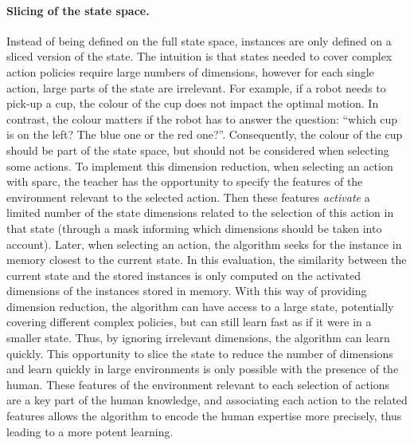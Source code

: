 \paragraph{Slicing of the state space.} Instead of being defined on the full state space, instances are only defined on a sliced version of the state. The intuition is that states needed to cover complex action policies require large numbers of dimensions, however for each single action, large parts of the state are irrelevant. For example, if a robot needs to pick-up a cup, the colour of the cup does not impact the optimal motion. In contrast, the colour matters if the robot has to answer the question: ``which cup is on the left? The blue one or the red one?''. Consequently, the colour of the cup should be part of the state space, but should not be considered when selecting some actions. To implement this dimension reduction, when selecting an action with \gls{sparc}, the teacher has the opportunity to specify the features of the environment relevant to the selected action. Then these features \textit{activate} a limited number of the state dimensions related to the selection of this action in that state (through a mask informing which dimensions should be taken into account). Later, when selecting an action, the algorithm seeks for the instance in memory closest to the current state. In this evaluation, the similarity between the current state and the stored instances is only computed on the activated dimensions of the instances stored in memory. With this way of providing dimension reduction, the algorithm can have access to a large state, potentially covering different complex policies, but can still learn fast as if it were in a smaller state. Thus, by ignoring irrelevant dimensions, the algorithm can learn quickly. This opportunity to slice the state to reduce the number of dimensions and learn quickly in large environments is only possible with the presence of the human. These features of the environment relevant to each selection of actions are a key part of the human knowledge, and associating each action to the related features allows the algorithm to encode the human expertise more precisely, thus leading to a more potent learning.

